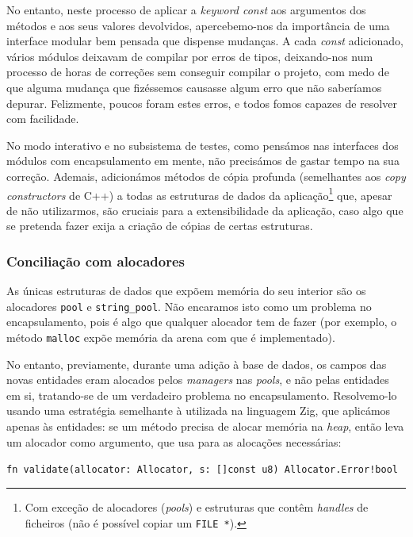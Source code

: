 \documentclass[12pt, a4paper]{article}
\begin{document}
No entanto, neste processo de aplicar a \emph{keyword const} aos argumentos dos métodos e aos seus
valores devolvidos, apercebemo-nos da importância de uma interface modular bem pensada que
dispense mudanças. A cada \emph{const} adicionado, vários módulos deixavam de compilar por erros de
tipos, deixando-nos num processo de horas de correções sem conseguir compilar o projeto, com medo de
que alguma mudança que fizéssemos causasse algum erro que não saberíamos depurar. Felizmente, poucos
foram estes erros, e todos fomos capazes de resolver com facilidade.

No modo interativo e no subsistema de testes, como pensámos nas interfaces dos módulos com
encapsulamento em mente, não precisámos de gastar tempo na sua correção. Ademais, adicionámos
métodos de cópia profunda (semelhantes aos \emph{copy constructors} de C++) a todas as estruturas
de dados da aplicação\footnote{Com exceção de alocadores (\emph{pools}) e estruturas que contêm
\emph{handles} de ficheiros (não é possível copiar um \texttt{FILE *}).} que, apesar de não
utilizarmos, são cruciais para a extensibilidade da aplicação, caso algo que se pretenda fazer
exija a criação de cópias de certas estruturas.

\subsubsection{Conciliação com alocadores}
\label{sec:allocator-conciliation}

As únicas estruturas de dados que expõem memória do seu interior são os alocadores \texttt{pool} e
\texttt{string\_pool}. Não encaramos isto como um problema no encapsulamento, pois é algo que
qualquer alocador tem de fazer (por exemplo, o método \texttt{malloc} expõe memória da arena com
que é implementado).

No entanto, previamente, durante uma adição à base de dados, os campos das novas entidades eram
alocados pelos \emph{managers} nas \emph{pools}, e não pelas entidades em si, tratando-se de um
verdadeiro problema no encapsulamento. Resolvemo-lo usando uma estratégia semelhante à utilizada na
linguagem Zig, que aplicámos apenas às entidades: se um método precisa de alocar memória na
\emph{heap}, então leva um alocador como argumento, que usa para as alocações necessárias:

\begin{center}
    \texttt{fn validate(allocator: Allocator, s: []const u8) Allocator.Error!bool}
\end{center}
\end{document}
